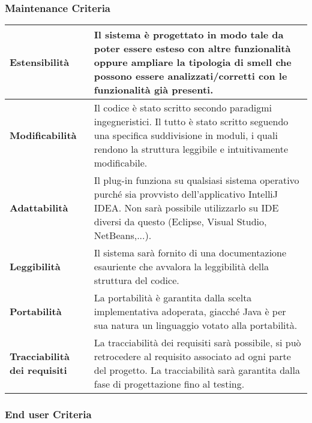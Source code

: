 \subsubsection{Maintenance Criteria}

		\begin{tabular}{|p{3cm}|p{13cm}|}
			\hline
			
			\vfill \centering \textbf{Estensibilità} \vfill & \vfill Il sistema è progettato in modo tale da poter essere esteso con altre funzionalità oppure ampliare la tipologia di smell che possono essere analizzati/corretti con le funzionalità già presenti. \vfill \\
			\hline 			
			\vfill \centering \textbf{Modificabilità} \vfill & \vfill Il codice è stato scritto secondo paradigmi ingegneristici. Il tutto è stato scritto seguendo una specifica suddivisione in moduli, i quali rendono la struttura leggibile e intuitivamente modificabile. \vfill \\
			\hline
			\vfill \centering \textbf{Adattabilità} \vfill & \vfill Il plug-in funziona su qualsiasi sistema operativo purché sia provvisto dell'applicativo IntelliJ IDEA. Non sarà possibile utilizzarlo su IDE diversi da questo (Eclipse, Visual Studio, NetBeans,...). \vfill \\
			\hline
			\vfill \centering \textbf{Leggibilità} \vfill & \vfill Il sistema sarà fornito di una documentazione esauriente che avvalora la leggibilità della struttura del codice. \vfill \\
			\hline 			
			\vfill \centering \textbf{Portabilità} \vfill & \vfill La portabilità è garantita dalla scelta implementativa adoperata, giacché Java è per sua natura un linguaggio votato alla portabilità. \vfill \\
			\hline
			\vfill \centering \textbf{Tracciabilità dei requisiti} \vfill & \vfill La tracciabilità dei requisiti sarà possibile, si può retrocedere al requisito associato ad ogni parte del progetto. La tracciabilità sarà garantita dalla fase di progettazione fino al testing. \vfill \\
			\hline
			
		\end{tabular}

\subsubsection{End user Criteria}

